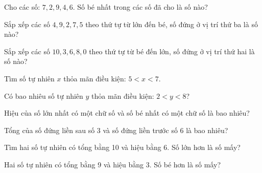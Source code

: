 \begin{ex}
Cho các số: $7, 2, 9, 4, 6$. Số bé nhất trong các số đã cho là số nào?
\end{ex}

\begin{ex}
Sắp xếp các số $4, 9, 2, 7, 5$ theo thứ tự từ lớn đến bé, số đứng ở vị trí thứ ba là số nào?
\end{ex}

\begin{ex}
Sắp xếp các số $10, 3, 6, 8, 0$ theo thứ tự từ bé đến lớn, số đứng ở vị trí thứ hai là số nào?
\end{ex}

\begin{ex}
Tìm số tự nhiên $x$ thỏa mãn điều kiện: $5 < x < 7$.
\end{ex}

\begin{ex}
Có bao nhiêu số tự nhiên $y$ thỏa mãn điều kiện: $2 < y < 8$?
\end{ex}

\begin{ex}
Hiệu của số lớn nhất có một chữ số và số bé nhất có một chữ số là bao nhiêu?
\end{ex}

\begin{ex}
Tổng của số đứng liền sau số 3 và số đứng liền trước số 6 là bao nhiêu?
\end{ex}

\begin{ex}
Tìm hai số tự nhiên có tổng bằng 10 và hiệu bằng 6. Số lớn hơn là số mấy?
\end{ex}

\begin{ex}
Hai số tự nhiên có tổng bằng 9 và hiệu bằng 3. Số bé hơn là số mấy?
\end{ex}

